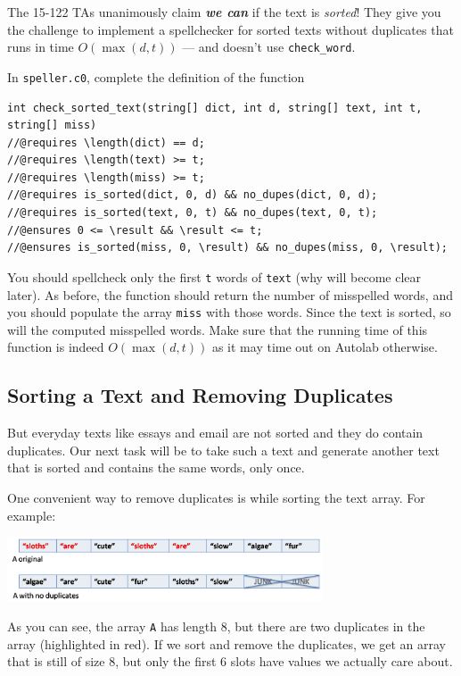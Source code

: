 \documentclass[12pt]{exam}
\begin{document}
The 15-122 TAs unanimously claim \textbf{\em we can} if the text is
\emph{sorted}!  They give you the challenge to implement a
spellchecker for sorted texts without duplicates that runs in time
$O(\max(d,t))$ --- and doesn't use \lstinline'check_word'.

\newpage
\begin{task}[4]
In \lstinline'speller.c0', complete the definition of the function
\begin{lstlisting}[basicstyle=\smallbasicstyle]
int check_sorted_text(string[] dict, int d, string[] text, int t, string[] miss)
//@requires \length(dict) == d;
//@requires \length(text) >= t;
//@requires \length(miss) >= t;
//@requires is_sorted(dict, 0, d) && no_dupes(dict, 0, d);
//@requires is_sorted(text, 0, t) && no_dupes(text, 0, t);
//@ensures 0 <= \result && \result <= t;
//@ensures is_sorted(miss, 0, \result) && no_dupes(miss, 0, \result);
\end{lstlisting}
You should spellcheck only the first \lstinline't' words of
\lstinline'text' (why will become clear later).  As before, the
function should return the number of misspelled words, and you should
populate the array \lstinline'miss' with those words.  Since the text
is sorted, so will the computed misspelled words.  Make sure that the
running time of this function is indeed $O(\max(d,t))$ as it may time
out on Autolab otherwise.
\end{task}


\subsection{Sorting a Text and Removing Duplicates}

But everyday texts like essays and email are not sorted and they do
contain duplicates.  Our next task will be to take such a text and
generate another text that is sorted and contains the same words, only
once.

One convenient way to remove duplicates is while sorting the text
array.  For example:
\begin{center}
\includegraphics[width=0.7\textwidth]{img/dupes.png}
\end{center}
As you can see, the array \lstinline'A' has length 8, but there are
two duplicates in the array (highlighted in red).  If we sort and
remove the duplicates, we get an array that is still of size 8, but
only the first 6 slots have values we actually care about.
\end{document}
